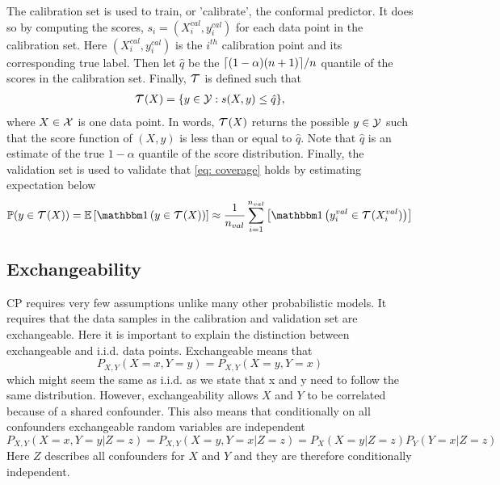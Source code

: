 The calibration set is used to train, or 'calibrate', the conformal predictor. It does so by computing the scores, $s_i = (X^{cal}_i, y^{cal}_i)$ for each data point in the calibration set. Here $(X^{cal}_i, y^{cal}_i)$ is the $i^{th}$ calibration point and its corresponding true label. Then let $\hat q$ be the $\lceil {(1-\alpha)(n+1)} \rceil/n$ quantile of the scores in the calibration set. Finally, $\Tau$ is defined such that 
\begin{gather}
\Tau(X) = \{y\in\Y : s(X,y) \leq \hat q\},
\label{eq: def. prediction set}
\end{gather}
where $X\in\mathcal{X}$ is one data point. In words, $\Tau(X)$ returns the possible $y\in\mathcal{Y}$ such that the score function of $(X,y)$ is less than or equal to $\hat q$. Note that $\hat q$ is an estimate of the true $1-\alpha$ quantile of the score distribution. Finally, the validation set is used to validate that \cref{eq: coverage} holds by estimating expectation below
\begin{gather}
    \doubleP(y\in\Tau(X)) = \doubleE\left[\doubleOne\left(y\in\Tau(X)\right)\right] \approx \frac{1}{n_{val}}\sum_{i=1}^{n_{val}}\left[\doubleOne\left(y^{val}_i\in\Tau(X^{val}_i)\right)\right]
    \label{eq: coverage expactation}
\end{gather}

% 
%
\subsection{Exchangeability}
CP requires very few assumptions unlike many other probabilistic models. It requires that the data samples in the calibration and validation set are exchangeable. Here it is important to explain the distinction between exchangeable and i.i.d. data points. Exchangeable means that 
\[
P_{X, Y}(X=x, Y=y) = P_{X, Y}(X=y, Y=x)
\]
which might seem the same as i.i.d. as we state that x and y need to follow the same distribution. However, exchangeability allows $X$ and $Y$ to be correlated because of a shared confounder. This also means that conditionally on all confounders exchangeable random variables are independent 
\[
P_{X, Y}(X=x, Y=y|Z=z) = P_{X, Y}(X=y, Y=x|Z=z) = P_{X}(X=y|Z=z)P_{Y}(Y=x|Z=z)
\]
Here $Z$ describes all confounders for $X$ and $Y$ and they are therefore conditionally independent. 
%
%
